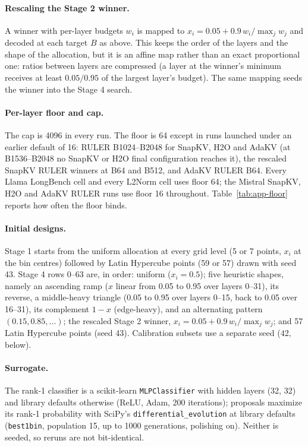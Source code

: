 \paragraph{Rescaling the Stage 2 winner.} A winner with per-layer budgets $w_i$ is mapped to $x_i = 0.05 + 0.9\,w_i / \max_j w_j$ and decoded at each target $B$ as above. This keeps the order of the layers and the shape of the allocation, but it is an affine map rather than an exact proportional one: ratios between layers are compressed (a layer at the winner's minimum receives at least $0.05/0.95$ of the largest layer's budget). The same mapping seeds the winner into the Stage 4 search.

\paragraph{Per-layer floor and cap.} The cap is 4096 in every run. The floor is 64 except in runs launched under an earlier default of 16: RULER B1024--B2048 for SnapKV, H2O and AdaKV (at B1536--B2048 no SnapKV or H2O final configuration reaches it), the rescaled SnapKV RULER winners at B64 and B512, and AdaKV RULER B64. Every Llama LongBench cell and every L2Norm cell uses floor 64; the Mistral SnapKV, H2O and AdaKV RULER runs use floor 16 throughout. Table~\ref{tab:app-floor} reports how often the floor binds.

\paragraph{Initial designs.} Stage 1 starts from the uniform allocation at every grid level (5 or 7 points, $x_i$ at the bin centres) followed by Latin Hypercube points (59 or 57) drawn with seed 43. Stage 4 rows 0--63 are, in order: uniform ($x_i = 0.5$); five heuristic shapes, namely an ascending ramp ($x$ linear from 0.05 to 0.95 over layers 0--31), its reverse, a middle-heavy triangle (0.05 to 0.95 over layers 0--15, back to 0.05 over 16--31), its complement $1-x$ (edge-heavy), and an alternating pattern $(0.15, 0.85, \dots)$; the rescaled Stage 2 winner, $x_i = 0.05 + 0.9\,w_i/\max_j w_j$; and 57 Latin Hypercube points (seed 43). Calibration subsets use a separate seed (42, below).

\paragraph{Surrogate.} The rank-1 classifier is a scikit-learn \texttt{MLPClassifier} with hidden layers (32, 32) and library defaults otherwise (ReLU, Adam, 200 iterations); proposals maximize its rank-1 probability with SciPy's \texttt{differential\_evolution} at library defaults (\texttt{best1bin}, population 15, up to 1000 generations, polishing on). Neither is seeded, so reruns are not bit-identical.

